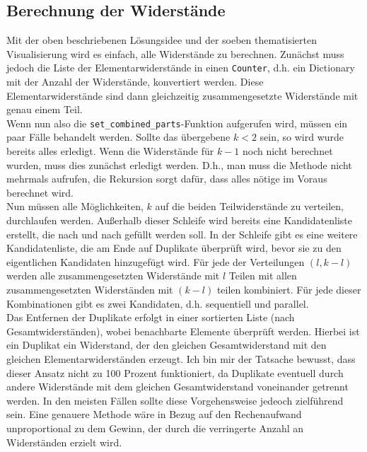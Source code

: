 \documentclass[a4paper,10pt,ngerman]{scrartcl}
\begin{document}
\subsection{Berechnung der Widerst\"ande}
Mit der oben beschriebenen L\"osungsidee und der soeben thematisierten
Visualisierung wird es einfach, alle Widerst\"ande zu berechnen. Zun\"achst
muss jedoch die Liste der Elementarwiderst\"ande in einen \texttt{Counter},
d.h. ein Dictionary mit der Anzahl der Widerst\"ande, konvertiert werden.
Diese Elementarwiderst\"ande sind dann gleichzeitig zusammengesetzte
Widerst\"ande mit genau einem Teil.\\
\indent Wenn nun also die \texttt{set\_combined\_parts}-Funktion aufgerufen
wird, m\"ussen ein paar F\"alle behandelt werden. Sollte das \"ubergebene
$k<2$ sein, so wird wurde bereits alles erledigt. Wenn die Widerst\"ande
f\"ur $k-1$ noch nicht berechnet wurden, muss dies zun\"achst erledigt werden.
D.h., man muss die Methode nicht mehrmals aufrufen, die Rekursion sorgt
daf\"ur, dass alles n\"otige im Voraus berechnet wird.\\
\indent Nun m\"ussen alle M\"oglichkeiten, $k$ auf die beiden Teilwiderst\"ande
zu verteilen, durchlaufen werden. Au\ss erhalb dieser Schleife wird bereits
eine Kandidatenliste erstellt, die nach und nach gef\"ullt werden soll.
In der Schleife gibt es eine weitere Kandidatenliste, die am Ende auf
Duplikate \"uberpr\"uft wird, bevor sie zu den eigentlichen Kandidaten
hinzugef\"ugt wird. F\"ur jede der Verteilungen $(l, k-l)$ werden alle
zusammengesetzten Widerst\"ande mit $l$ Teilen mit allen zusammengesetzten
Widerst\"anden mit $(k-l)$ teilen kombiniert. F\"ur jede dieser Kombinationen
gibt es zwei Kandidaten, d.h. sequentiell und parallel.\\
\indent Das Entfernen der Duplikate erfolgt in einer sortierten Liste
(nach Gesamtwiderst\"anden), wobei benachbarte Elemente \"uberpr\"uft
werden. Hierbei ist ein Duplikat ein Widerstand, der den gleichen
Gesamtwiderstand mit den gleichen Elementarwiderst\"anden erzeugt.
Ich bin mir der Tatsache bewusst, dass dieser Ansatz nicht zu 100 Prozent 
funktioniert, da Duplikate eventuell durch andere Widerst\"ande mit
dem gleichen Gesamtwiderstand voneinander getrennt werden. In den meisten
F\"allen sollte diese Vorgehensweise jedeoch zielf\"uhrend sein. Eine
genauere Methode w\"are in Bezug auf den Rechenaufwand unproportional
zu dem Gewinn, der durch die verringerte Anzahl an Widerst\"anden
erzielt wird.
\end{document}
